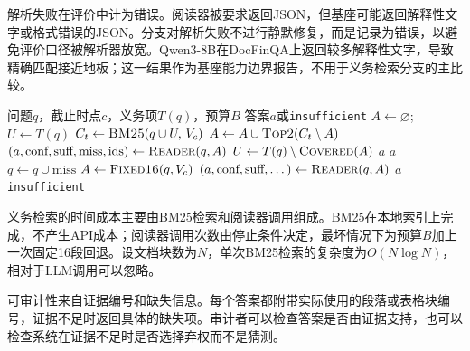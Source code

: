 解析失败在评价中计为错误。阅读器被要求返回JSON，但基座可能返回解释性文字或格式错误的JSON。分支对解析失败不进行静默修复，而是记录为错误，以避免评价口径被解析器放宽。Qwen3-8B在DocFinQA上返回较多解释性文字，导致精确匹配接近地板；这一结果作为基座能力边界报告，不用于义务检索分支的主比较。

\begin{algorithm}[H]
\caption{义务检索的单轮取证}
\label{alg:obligation}
\begin{algorithmic}[1]
\Require 问题$q$，截止时点$c$，义务项$T(q)$，预算$B$
\Ensure 答案$a$或\texttt{insufficient}
\State $A\gets\varnothing$; $U\gets T(q)$
  \State $C_t\gets\textsc{BM25}(q\cup U,\,V_c)$
  \State $A\gets A\cup\textsc{Top2}(C_t\setminus A)$
  \State $(a,\text{conf},\text{suff},\text{miss},\text{ids})\gets\textsc{Reader}(q,A)$
  \State $U\gets T(q)\setminus\textsc{Covered}(A)$
    \State \Return $a$
  \EndIf
    \State \Return $a$
  \EndIf
  \State $q\gets q\cup\text{miss}$
\EndFor
\State $A\gets\textsc{Fixed16}(q,V_c)$
\State $(a,\text{conf},\text{suff},\dots)\gets\textsc{Reader}(q,A)$
  \State \Return $a$
\Else
  \State \Return \texttt{insufficient}
\EndIf
\end{algorithmic}
\end{algorithm}

义务检索的时间成本主要由BM25检索和阅读器调用组成。BM25在本地索引上完成，不产生API成本；阅读器调用次数由停止条件决定，最坏情况下为预算$B$加上一次固定16段回退。设文档块数为$N$，单次BM25检索的复杂度为$O(N\log N)$，相对于LLM调用可以忽略。

可审计性来自证据编号和缺失信息。每个答案都附带实际使用的段落或表格块编号，证据不足时返回具体的缺失项。审计者可以检查答案是否由证据支持，也可以检查系统在证据不足时是否选择弃权而不是猜测。


